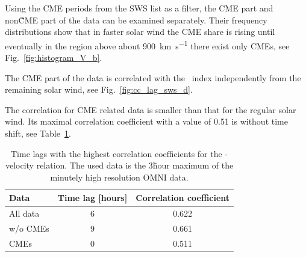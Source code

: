 Using the CME periods from the SWS list as a filter, the CME part and non\~CME part of the data can be examined separately. Their frequency distributions show that in faster solar wind the CME share is rising until eventually in the region above about \SI{900}{\km\per\s} there exist only CMEs, see Fig.~\ref{fig:histogram_V_b}.

The CME part of the data is correlated with the \Kp~index independently from the remaining solar wind, see Fig.~\ref{fig:cc_lag_sws_d}.
\begin{figure}
\end{figure}
The correlation for CME related data is smaller than that for the regular solar wind. Its maximal correlation coefficient with a value of 0.51 is without time shift, see Table~\ref{tab:correlation_coefficients_kpvsv}.
\begin{table}
	\caption{Time lags with the highest correlation coefficients for the \Kp{}-velocity relation. The used data is the 3\~hour maximum of the minutely high resolution OMNI data.}
	\label{tab:correlation_coefficients_kpvsv}
	\centering
	\begin{tabular}{lcc}
		\hline\hline
		Data	&Time lag [hours]	&Correlation coefficient\\
		\hline
		All data	&6	&0.622\\
		w/o CMEs	&9	&0.661\\
		CMEs	&0	&0.511\\
		\hline
	\end{tabular}
\end{table}
